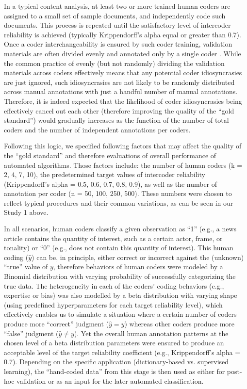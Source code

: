\documentclass[man, floatsintext, 12pt, a4paper, noextraspace]{apa6}
\begin{document}
    In a typical content analysis, at least two or more trained human coders are assigned to a small set of sample documents, and independently code such documents. This process is repeated until the satisfactory level of intercoder reliability is achieved (typically Krippendorff’s alpha equal or greater than 0.7). Once a coder interchangeability is ensured by such coder training, validation materials are often divided evenly and annotated only by a single coder \parencite{grimmer2018unreliability}. While the common practice of evenly (but not randomly) dividing the validation materials across coders effectively means that any potential coder idiosyncrasies are just ignored, such idiosyncrasies are not likely to be randomly distributed across manual annotations with just a handful number of manual annotations. Therefore, it is indeed expected that the likelihood of coder idiosyncrasies being effectively cancel out each other (therefore improving the quality of the “gold standard”) would gradually increases as the function of the number of total coders and the number of independent annotations per coders.        
    
    Following this logic, we specified following factors that may affect the quality of the “gold standard” and therefore evaluations of overall performance of automated algorithms. Those factors include: the number of human coders (k = 2, 4, 7, 10), the predetermined target values of intercoder reliability (Krippendorff's alpha = 0.5, 0.6, 0.7, 0.8, 0.9), as well as the number of annotation per coder (n = 50, 100, 250, 500). These numbers were chosen to reflect typical procedures and their common variations, as can be seen in our Study 1 above.
    
    In all scenarios, human coders classify a given observation as ``1'' (e.g., a news article contains the quantity of interest, such as a certain actor, frame, or tonality) or ``0'' (e.g., does not contain this quantity of interest). This human coding ($\hat{y}$) can be, in principle, either correct or incorrect against the (unknown) “true” value of $y$, therefore behaviors of human coders were modeled by a Binomial distribution with varying probability of successfully categorizing the true data. The heterogeneity in each of the coders’ coding behaviors (e.g., expertise or bias) was also modelled by a beta distribution with varying shape (using predefined hyperparameters for each target reliability level), which effectively enables us to simulate a situation where a certain number of coders produce more “correct” judgment ($\hat{y} = y$) whereas other coders produce more ``false'' judgment ($\hat{y} \neq y$). Yet the overall human annotation patterns at the chosen level of a beta distribution parameters were ensured to produce an acceptable level of the target reliability coefficient (e.g., Krippendorff's alpha = 0.7). Depending on the specific application (dictionary-based vs. supervised learning), the \enquote{hand-coded data} from this stage is then used as either for post-hoc validation or as an input for the later automated classification. 
    
\end{document}
